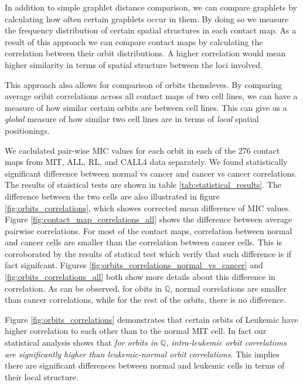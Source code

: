 \documentclass[a4,center,fleqn]{NAR}
\begin{document}
In addition to simple graphlet distance comparison,
we can compare graphlets by calculating
how often certain graphlets occur in them. By doing so
we measure the frequency distribution
of certain spatial structures in
each contact map. As a result of this approach
we can compare contact maps by calculating the 
correlation between their orbit distributions.
A higher correlation would mean higher similarity
in terms of spatial structure between the loci
involved.

This approach also allows for comparison of orbits
themsleves. By comparing average oribit correlations
across all contact maps of two cell lines, we can
have a measure of how similar certain orbits are
between cell lines. This can give us a 
\textit{global} measure
of how similar two cell lines are in terms of 
\textit{local} spatial positionings.

We caclulated pair-wise MIC values 
for each orbit in each of the 276
contact maps from MIT, ALL, RL, and CALL4 data separately. 
We found statistically significant difference between
normal vs cancer and cancer vs cancer correlations.
The results of staistical tests are shown in table
\ref{tab:statistical_results}. The difference
between the two cells are also illustrated in figure
\ref{fig:orbits_correlations}, which showes corrected
mean difference of MIC values. Figure 
\ref{fig:contact_map_correlations_all} shows the difference
between average pairwise
correlations. For most of the contact maps, correlation
between normal and cancer cells are smaller
than the correlation between cancer cells. This is corroborated
by the results of statical test which verify that such difference
is if fact signifcant.
Figures \ref{fig:orbits_correlations_normal_vs_cancer} and
\ref{fig:orbits_correlations_all} both show more details about
this difference in correlation. As can be observed, for obits
in $\mathbb{Q}$, normal correlations are smaller than cancer
correlations, while for the rest of the orbits, there is no
difference.

Figure \ref{fig:orbits_correlations} demonstrates that certain
orbits of Leukemic have higher correlation to each other 
than to the
normal MIT cell. In fact our statistical analysis shows that 
\textit {for orbits in $\mathbb{Q}$, 
intra-leukemic orbit correlations are significantly higher
than leukemic-normal orbit correlations}. This implies
there are significant differences between normal and
leukemic cells in terms of their local structure.
\end{document}
